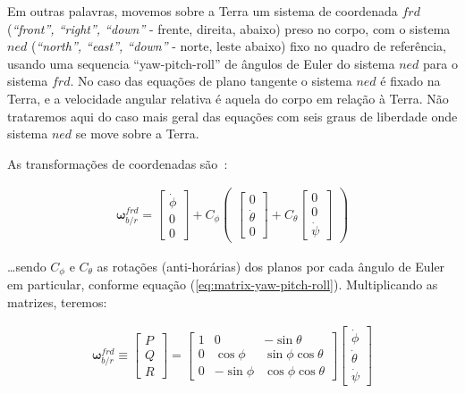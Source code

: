 Em outras palavras, movemos sobre a Terra um sistema de coordenada \(frd\) (\emph{``front'', ``right'', ``down''} - frente, direita, abaixo) preso no corpo, com o sistema \(ned\) (\emph{``north'', ``east'', ``down''} - norte, leste abaixo) fixo no quadro de referência, usando uma sequencia ``yaw-pitch-roll'' de ângulos de Euler do sistema \(ned\) para o sistema \(frd\). No caso das equações de plano tangente o sistema \(ned\) é fixado na Terra, e a velocidade angular relativa é aquela do corpo em relação à Terra. Não trataremos aqui do caso mais geral das equações com seis graus de liberdade onde sistema \(ned\) se move sobre a Terra.

As transformações de coordenadas são~\cite{Stevens2016}:

\begin{align*}
    \mathbf{\omega}^{frd}_{b/r} = \begin{bmatrix} \dot\phi \\ 0 \\0 \end{bmatrix}
    + C_{\phi} \begin{pmatrix}
        \begin{bmatrix} 0 \\ \dot\theta \\ 0 \end{bmatrix}
        + C_{\theta}\begin{bmatrix} 0 \\ 0 \\ \dot\psi \end{bmatrix}
    \end{pmatrix}
\end{align*}

\ldots sendo \(C_{\phi}\) e \(C_{\theta}\)  as rotações (anti-horárias) dos planos por cada ângulo de Euler em particular, conforme equação (\ref{eq:matrix-yaw-pitch-roll}). Multiplicando as matrizes, teremos:

\begin{align}\label{eq:1.4-3}%
    \mathbf{\omega}^{frd}_{b/r} \equiv \begin{bmatrix} P \\ Q \\ R \end{bmatrix}
    = \begin{bmatrix}
        1 & 0 & -\sin{\theta} \\
        0 & \cos{\phi} & \sin{\phi}\cos{\theta} \\
        0 & -\sin{\phi} & \cos{\phi}\cos{\theta}
    \end{bmatrix}
    \begin{bmatrix}
        \dot\phi \\
        \dot\theta \\
        \dot\psi
    \end{bmatrix}
\end{align}

